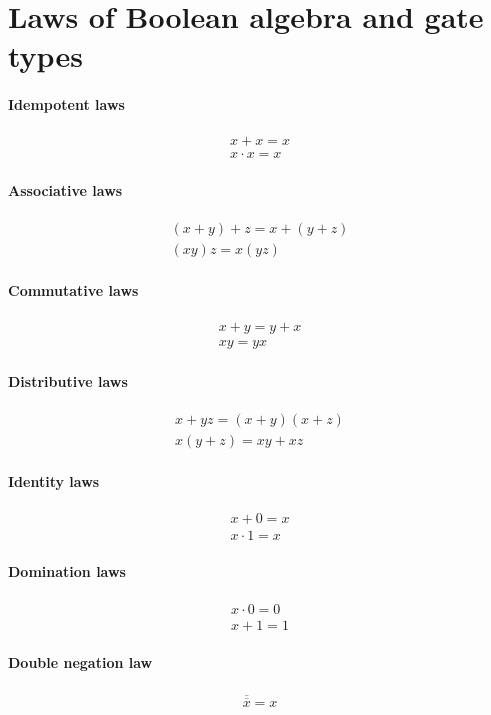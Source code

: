 \documentclass[a4paper]{article}
\begin{document}
\pagebreak

\section{Laws of Boolean algebra and gate types}
\paragraph{Idempotent laws}
\begin{align*}
  x + x = x \\
  x \cdot x = x
\end{align*}
\paragraph{Associative laws}
\begin{align*}
  (x + y) + z = x + (y + z) \\
  (x  y)  z = x  (y  z)
\end{align*}
\paragraph{Commutative laws}
\begin{align*}
  x + y = y + x \\
  x  y = y  x
\end{align*}
\paragraph{Distributive laws}
\begin{align*}
  x + y  z = (x + y)  (x + z) \\
  x  (y + z) = x  y + x  z
\end{align*}
\paragraph{Identity laws}
\begin{align*}
  x + 0 = x \\
x \cdot 1 = x
\end{align*}
\paragraph{Domination laws}
\begin{align*}
  x \cdot 0 = 0 \\
  x + 1 = 1
\end{align*}
\paragraph{Double negation law}
\begin{align*}
  \overline{ \overline{ x}} = x
\end{align*}
\end{document}
